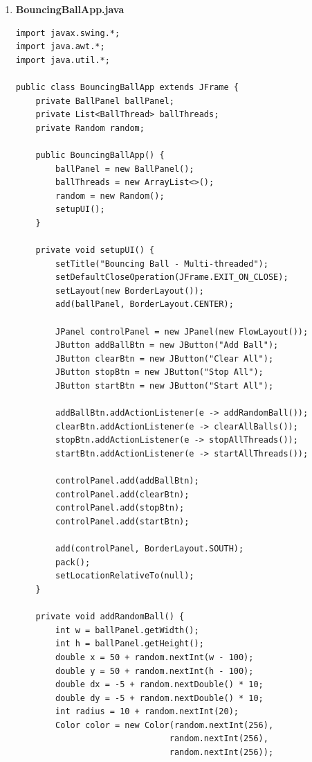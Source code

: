 \documentclass[a4paper]{article}
\begin{document}
\begin{enumerate}[itemsep=1em]
\begin{enumerate}[itemsep=1em]
\begin{verbatim}
    public List<Ball> getBalls() {
        return balls;
    }

    @Override
    protected void paintComponent(Graphics g) {
        super.paintComponent(g);
        synchronized (balls) {
            for (Ball ball : balls) {
                ball.draw(g);
            }
        }
    }

    public void updateBallPanelSize() {
        int w = getWidth(), h = getHeight();
        synchronized (balls) {
            for (Ball ball : balls) {
                ball.updatePanelSize(w, h);
            }
        }
    }
}
    \end{verbatim}
    \item \textbf{BouncingBallApp.java}
    \begin{verbatim}
import javax.swing.*;
import java.awt.*;
import java.util.*;

public class BouncingBallApp extends JFrame {
    private BallPanel ballPanel;
    private List<BallThread> ballThreads;
    private Random random;

    public BouncingBallApp() {
        ballPanel = new BallPanel();
        ballThreads = new ArrayList<>();
        random = new Random();
        setupUI();
    }

    private void setupUI() {
        setTitle("Bouncing Ball - Multi-threaded");
        setDefaultCloseOperation(JFrame.EXIT_ON_CLOSE);
        setLayout(new BorderLayout());
        add(ballPanel, BorderLayout.CENTER);

        JPanel controlPanel = new JPanel(new FlowLayout());
        JButton addBallBtn = new JButton("Add Ball");
        JButton clearBtn = new JButton("Clear All");
        JButton stopBtn = new JButton("Stop All");
        JButton startBtn = new JButton("Start All");

        addBallBtn.addActionListener(e -> addRandomBall());
        clearBtn.addActionListener(e -> clearAllBalls());
        stopBtn.addActionListener(e -> stopAllThreads());
        startBtn.addActionListener(e -> startAllThreads());

        controlPanel.add(addBallBtn);
        controlPanel.add(clearBtn);
        controlPanel.add(stopBtn);
        controlPanel.add(startBtn);

        add(controlPanel, BorderLayout.SOUTH);
        pack();
        setLocationRelativeTo(null);
    }

    private void addRandomBall() {
        int w = ballPanel.getWidth();
        int h = ballPanel.getHeight();
        double x = 50 + random.nextInt(w - 100);
        double y = 50 + random.nextInt(h - 100);
        double dx = -5 + random.nextDouble() * 10;
        double dy = -5 + random.nextDouble() * 10;
        int radius = 10 + random.nextInt(20);
        Color color = new Color(random.nextInt(256),
                               random.nextInt(256),
                               random.nextInt(256));


\end{verbatim}
\end{enumerate}
\end{enumerate}
\end{document}
